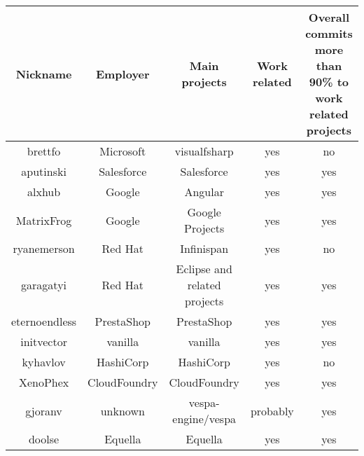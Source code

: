 \begin{table}
    \begin{center}
        \begin{tabular}{|c c c c c|}
            \toprule
            Nickname & Employer & Main projects & Work related & Overall commits more than 90\% to work related projects \\ [0.5ex]
            \midrule \midrule

            brettfo              &   Microsoft         &  visualfsharp                     &   yes             &    no \\
            \midrule
            aputinski            &   Salesforce        &  Salesforce                       &   yes             &    yes \\
            \midrule
            alxhub               &   Google            &  Angular                          &   yes             &    yes \\
            \midrule
            MatrixFrog           &   Google            &  Google Projects                  &   yes             &    yes \\
            \midrule
            ryanemerson          &   Red Hat           &  Infinispan                       &   yes             &    no \\
            \midrule
            garagatyi            &   Red Hat           &  Eclipse and related projects     &   yes             &    yes \\
            \midrule
            eternoendless        &   PrestaShop        &  PrestaShop                       &   yes             &    yes \\
            \midrule
            initvector           &   vanilla           &  vanilla                          &   yes             &    yes \\
            \midrule
            kyhavlov             &   HashiCorp         &  HashiCorp                        &   yes             &    no \\
            \midrule
            XenoPhex             &   CloudFoundry      &  CloudFoundry                     &   yes             &    yes \\
            \midrule
            gjoranv              &   unknown           &  vespa-engine/vespa               &   probably        &    yes \\
            \midrule
            doolse               &   Equella           &  Equella                          &   yes             &    yes \\

\end{tabular}
\end{center}
\end{table}
